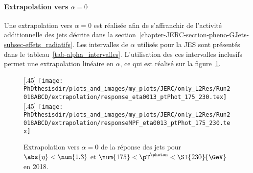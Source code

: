 \paragraph{Extrapolation vers $\alpha=0$}
Une extrapolation vers $\alpha=0$ est réalisée afin de s'affranchir de l'activité additionnelle des jets décrite dans la section~\ref{chapter-JERC-section-pheno-GJets-subsec-effets_radiatifs}.
Les intervalles de $\alpha$ utilisés pour la JES sont présentés dans le tableau~\ref{tab-alpha_intervalles}.
L'utilisation des ces intervalles inclusifs permet une extrapolation linéaire en $\alpha$, ce qui est réalisé sur la figure~\ref{fig-chapter-JERC-section-JES-subsec-analyse-responsebal_and_MPF_eta0013_ptPhot_175_230_extrap}.
\begin{figure}[h]
\centering
{}[.45\textwidth]
{\texttt{[image: \\PhDthesisdir/plots\_and\_images/my\_plots/JERC/only\_L2Res/Run2018ABCD/extrapolation/response\_eta0013\_ptPhot\_175\_230.tex]}}
\hfill
{}[.45\textwidth]
{\texttt{[image: \\PhDthesisdir/plots\_and\_images/my\_plots/JERC/only\_L2Res/Run2018ABCD/extrapolation/responseMPF\_eta0013\_ptPhot\_175\_230.tex]}}
\caption[Extrapolation vers $\alpha=0$ de la réponse des jets.]{Extrapolation vers $\alpha=0$ de la réponse des jets pour $\abs{\eta}<\num{1.3}$ et $\num{175}<\pT^{\photon}<\SI{230}{\GeV}$ en 2018.}
\label{fig-chapter-JERC-section-JES-subsec-analyse-responsebal_and_MPF_eta0013_ptPhot_175_230_extrap}
\end{figure}
